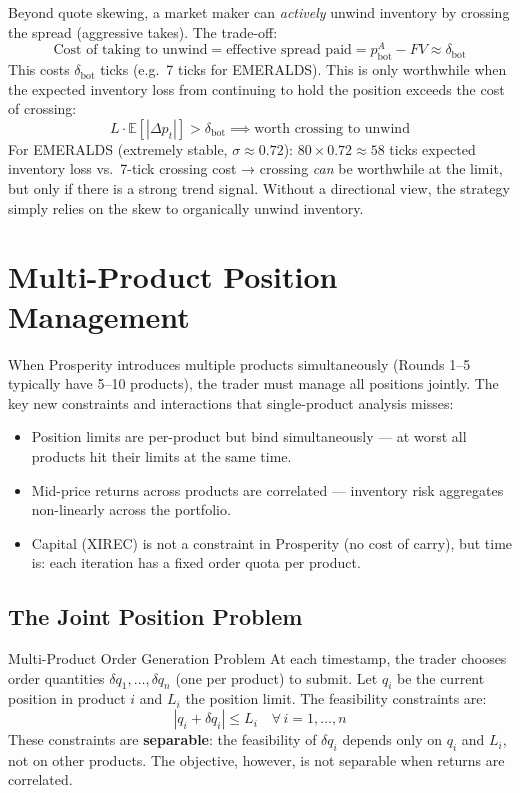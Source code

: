 \documentclass[12pt,a4paper,openany]{report}
\theoremstyle{definition}
\newcommand{\E}{\mathbb{E}}
\begin{document}
Beyond quote skewing, a market maker can \emph{actively} unwind inventory by crossing the spread (aggressive takes). The trade-off:
\begin{equation}
  \text{Cost of taking to unwind} = \text{effective spread paid} = p^A_{\text{bot}} - FV \approx \delta_{\text{bot}}
\end{equation}
This costs $\delta_{\text{bot}}$ ticks (e.g.\ 7 ticks for EMERALDS). This is only worthwhile when the expected inventory loss from continuing to hold the position exceeds the cost of crossing:
\[
  L \cdot \E[|\Delta p_t|] > \delta_{\text{bot}} \implies \text{worth crossing to unwind}
\]
For EMERALDS (extremely stable, $\sigma \approx 0.72$): $80 \times 0.72 \approx 58$ ticks expected inventory loss vs.\ 7-tick crossing cost → crossing \emph{can} be worthwhile at the limit, but only if there is a strong trend signal. Without a directional view, the strategy simply relies on the skew to organically unwind inventory.

\chapter{Multi-Product Position Management}
\label{ch:multiproduct}

When Prosperity introduces multiple products simultaneously (Rounds 1--5 typically have 5--10 products), the trader must manage all positions jointly. The key new constraints and interactions that single-product analysis misses:

\begin{itemize}
  \item Position limits are per-product but bind simultaneously — at worst all products hit their limits at the same time.
  \item Mid-price returns across products are correlated — inventory risk aggregates non-linearly across the portfolio.
  \item Capital (XIREC) is not a constraint in Prosperity (no cost of carry), but time is: each iteration has a fixed order quota per product.
\end{itemize}

\section{The Joint Position Problem}

\begin{definitionbox}{Multi-Product Order Generation Problem}
At each timestamp, the trader chooses order quantities $\delta q_1, \ldots, \delta q_n$ (one per product) to submit. Let $q_i$ be the current position in product $i$ and $L_i$ the position limit. The feasibility constraints are:
\[
  |q_i + \delta q_i| \leq L_i \quad \forall\, i = 1, \ldots, n
\]
These constraints are \textbf{separable}: the feasibility of $\delta q_i$ depends only on $q_i$ and $L_i$, not on other products. The objective, however, is not separable when returns are correlated.
\end{definitionbox}
\end{document}

